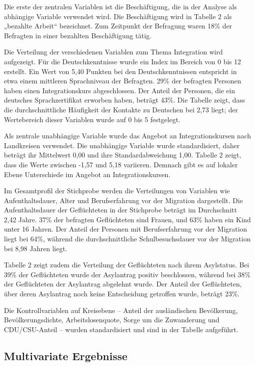 Die erste der zentralen Variablen ist die Beschäftigung, die in der Analyse als abhängige Variable verwendet wird. Die Beschäftigung wird in Tabelle 2 als „bezahlte Arbeit“ bezeichnet. Zum Zeitpunkt der Befragung waren 18\% der Befragten in einer bezahlten Beschäftigung tätig.



Die Verteilung der verschiedenen Variablen zum Thema Integration wird aufgezeigt. Für die Deutschkenntnisse wurde ein Index im Bereich von 0 bis 12 erstellt. Ein Wert von 5,40 Punkten bei den Deutschkenntnissen entspricht in etwa einem mittleren Sprachniveau der Befragten. 29\% der befragten Personen haben einen Integrationskurs abgeschlossen. Der Anteil der Personen, die ein deutsches Sprachzertifikat erworben haben, beträgt 43\%. Die Tabelle zeigt, dass die durchschnittliche Häufigkeit der Kontakte zu Deutschen bei 2,73 liegt; der Wertebereich dieser Variablen wurde auf 0 bis 5 festgelegt.

Als zentrale unabhängige Variable wurde das Angebot an Integrationskursen nach Landkreisen verwendet. Die unabhängige Variable wurde standardisiert, daher beträgt ihr Mittelwert 0,00 und ihre Standardabweichung 1,00. Tabelle 2 zeigt, dass die Werte zwischen -1,57 und 5,18 variieren. Demnach gibt es auf lokaler Ebene Unterschiede im Angebot an Integrationskursen.

Im Gesamtprofil der Stichprobe werden die Verteilungen von Variablen wie Aufenthaltsdauer, Alter und Berufserfahrung vor der Migration dargestellt. Die Aufenthaltsdauer der Geflüchteten in der Stichprobe beträgt im Durchschnitt 2,42 Jahre. 37\% der befragten Geflüchteten sind Frauen, und 63\% haben ein Kind unter 16 Jahren. Der Anteil der Personen mit Berufserfahrung vor der Migration liegt bei 64\%, während die durchschnittliche Schulbesuchsdauer vor der Migration bei 8,98 Jahren liegt.

Tabelle 2 zeigt zudem die Verteilung der Geflüchteten nach ihrem Asylstatus. Bei 39\% der Geflüchteten wurde der Asylantrag positiv beschlossen, während bei 38\% der Geflüchteten der Asylantrag abgelehnt wurde. Der Anteil der Geflüchteten, über deren Asylantrag noch keine Entscheidung getroffen wurde, beträgt 23\%.

Die Kontrollvariablen auf Kreisebene – Anteil der ausländischen Bevölkerung, Bevölkerungsdichte, Arbeitslosenquote, Sorge um die Zuwanderung und CDU/CSU-Anteil – wurden standardisiert und sind in der Tabelle aufgeführt.


\subsection{Multivariate Ergebnisse}
\label{sec:erg-multivariat}

